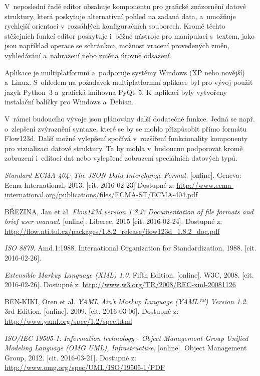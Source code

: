 \documentclass[FM,bw,DP]{tulthesis}
\begin{document}
V~neposlední řadě editor obsahuje komponentu pro grafické znázornění datové struktury, která poskytuje alternativní pohled na zadaná data, a~umožňuje rychlejší orientaci v~rozsáhlých konfiguračních souborech. Kromě těchto stěžejních funkcí editor poskytuje i~běžné nástroje pro manipulaci s~textem, jako jsou například operace se schránkou, možnost vracení provedených změn, vyhledávání a~nahrazení nebo změna úrovně odsazení.

Aplikace je multiplatformní a~podporuje systémy Windows (XP nebo novější) a~Linux. S~ohledem na požadavek multiplatformní aplikace byl pro vývoj použit jazyk Python~3 a~grafická knihovna PyQt~5. K~aplikaci byly vytvořeny instalační balíčky pro Windows a~Debian.

V~rámci budoucího vývoje jsou plánovány další dodatečné funkce. Jedná se např. o~zlepšení zvýraznění syntaxe, které se by se mohlo přizpůsobit přímo formátu Flow123d. Další možné vylepšení spočívá v~rozšíření funkcionality komponenty pro vizualizaci datové struktury. Ta by mohla v~budoucnu podporovat kromě zobrazení i~editaci dat nebo vylepšené zobrazení speciálních datových typů.

\begin{thebibliography}{9}


\textit{Standard ECMA-404: The JSON Data Interchange Format}. [online]. Geneva: Ecma International, 2013. [cit. 2016-02-23] Dostupné z: \url{http://www.ecma-international.org/publications/files/ECMA-ST/ECMA-404.pdf}

BŘEZINA, Jan et al. \textit{Flow123d version 1.8.2: Documentation of file formats and brief user manual}. [online]. Liberec, 2015 [cit. 2016-02-24]. Dostupné z: \url{http://flow.nti.tul.cz/packages/1.8.2_release/flow123d_1.8.2_doc.pdf}

\textit{ISO 8879}. Amd.1:1988. International Organization for Standardization, 1988. [cit. 2016-02-26]. 

\textit{Extensible Markup Language (XML) 1.0}. Fifth Edition. [online]. W3C, 2008. [cit. 2016-02-26]. Dostupné z: \url{http://www.w3.org/TR/2008/REC-xml-20081126}

BEN-KIKI, Oren et al. \textit{YAML Ain’t Markup Language (YAML™) Version 1.2}. 3rd Edition. [online]. 2009. [cit. 2016-03-06]. Dostupné z: \url{http://www.yaml.org/spec/1.2/spec.html}

\textit{ISO/IEC 19505-1: Information technology - Object Management Group
Unified Modeling Language (OMG UML),
Infrastructure}. [online]. Object Management Group, 2012. [cit. 2016-03-21]. Dostupné z: \url{http://www.omg.org/spec/UML/ISO/19505-1/PDF}


\end{thebibliography}
\end{document}
